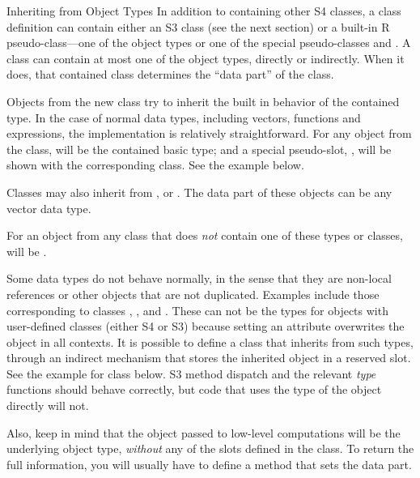 %
\begin{Section}{Inheriting from Object Types}
In addition to containing other S4 classes, a class definition can
contain either an S3 class (see the next section) or a built-in R pseudo-class---one
of the \R{}
object types or one of the special \R{} pseudo-classes  and
.
A class can contain at most one of the object types, directly or indirectly.
When it does, that contained class determines the ``data part''
of the class.

Objects from the new class try to inherit the built in
behavior of the contained type.
In the case of normal \R{} data types, including vectors, functions and
expressions, the implementation is relatively straightforward.
For any object  from the class,
 will be the contained basic type; and a special
pseudo-slot, , will be shown with the corresponding class.
See the  example below.

Classes may also inherit from ,  or
.
The data part of these objects can be any vector data type.

For an object from any class that does \emph{not} contain one of these
types or classes,
 will be .

Some \R{} data types do not behave normally, in the sense that they are
non-local references or other objects that are not duplicated.
Examples include those corresponding to classes , , and .
These can not be the types for objects with user-defined
classes (either S4 or S3) because setting an attribute overwrites the
object in all contexts.
It is possible to define a class that inherits from such types,
through an indirect mechanism that stores the inherited object in a
reserved slot.
See the
example for class  below.
S3 method dispatch and the relevant \emph{type}\code{()}
functions should behave correctly, but code that uses the type of the
object directly will not.

Also, keep in mind that the object passed to low-level computations
will be the underlying object type, \emph{without} any of the slots
defined in the class.
To return the full information, you will usually have to define a
method that sets the data part.

\end{Section}
%
